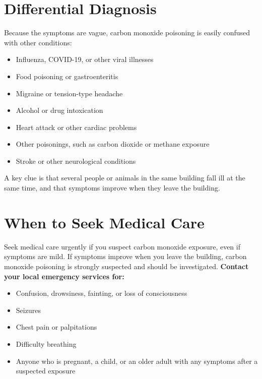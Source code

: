 \section*{Differential Diagnosis}
Because the symptoms are vague, carbon monoxide poisoning is easily confused with other conditions:
\begin{itemize}
    \item Influenza, COVID-19, or other viral illnesses
    \item Food poisoning or gastroenteritis
    \item Migraine or tension-type headache
    \item Alcohol or drug intoxication
    \item Heart attack or other cardiac problems
    \item Other poisonings, such as carbon dioxide or methane exposure
    \item Stroke or other neurological conditions
\end{itemize}
A key clue is that several people or animals in the same building fall ill at the same time, and that symptoms improve when they leave the building.

\section*{When to Seek Medical Care}
Seek medical care urgently if you suspect carbon monoxide exposure, even if symptoms are mild. If symptoms improve when you leave the building, carbon monoxide poisoning is strongly suspected and should be investigated.
\textbf{Contact your local emergency services for:}
\begin{itemize}
    \item Confusion, drowsiness, fainting, or loss of consciousness
    \item Seizures
    \item Chest pain or palpitations
    \item Difficulty breathing
    \item Anyone who is pregnant, a child, or an older adult with any symptoms after a suspected exposure
\end{itemize}

